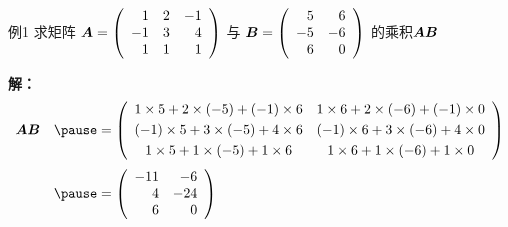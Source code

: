 \begin{frame}

\end{frame}

\begin{frame}
  \begin{footnotesize}
    \begin{exampleblock}{例1}
      求矩阵
      $
      \boldsymbol{A} = \left(
        \begin{array}{rrrr}
          1&2&-1\\
          -1&3&4\\
          1&1&1
        \end{array}
      \right)
      $
      与
      $
      \boldsymbol{B} = \left(
        \begin{array}{rrrr}
          5&6\\
          -5&-6\\
          6&0
        \end{array}
      \right)
      $
      的乘积$\boldsymbol{A}\boldsymbol{B}$
    \end{exampleblock}
    \pause
    \textbf{解：}
    $$
    \begin{array}{cl}
      \A\B &\pause = \left(
             \begin{array}{ccc}
               1\times5 + 2\times(-5) + (-1)\times6 &
                                                      1\times6 + 2\times(-6) + (-1)\times0 \\[0.1cm]
               (-1)\times5 + 3\times(-5) +    4\times6 &
                                                         (-1)\times6 + 3\times(-6) +    4\times0 \\[0.1cm]
               1\times5 + 1\times(-5) +    1\times6 &
                                                      1\times6 + 1\times(-6) +    1\times0 
             \end{array}
                                                      \right) \\[0.3in]
           &\pause =\left(
             \begin{array}{rr}
               -11 & -6\\
               4 & -24\\
               6 & 0
             \end{array}
                   \right)   
    \end{array}
    $$
  \end{footnotesize}
\end{frame}

